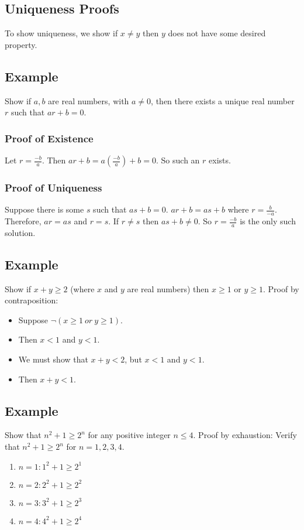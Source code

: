 \documentclass[letterpaper, 12pt]{math}
\begin{document}
\subsection*{Uniqueness Proofs}
To show uniqueness, we show if \( x \neq y \) then \( y \) does not have some
desired property.

\subsection*{Example}
Show if \( a,b \) are real numbers, with \( a \neq 0 \), then there exists a
unique real number \( r \) such that \( ar+b = 0 \).

\subsubsection*{Proof of Existence}
Let \( r = \frac{-b}{a} \). Then \( ar+b = a(\frac{-b}{a})+b = 0 \). So such an
\( r \) exists.

\subsubsection*{Proof of Uniqueness}
Suppose there is some \( s \) such that \( as+b = 0 \). \( ar+b = as+b \) where
\( r = \frac{b}{-a} \). Therefore, \( ar = as \) and \( r = s \). If
\( r \neq s \) then \( as+b \neq 0 \). So \( r = \frac{-b}{a} \) is the only
such solution.

\subsection*{Example}
Show if \( x + y \geq 2 \) (where \( x \) and \( y \) are real numbers) then
\( x \geq 1 \) or \( y \geq 1 \). Proof by contraposition:
\begin{itemize}
  \item Suppose \( \neg{(x \geq 1\ or\ y \geq 1)} \).
  \item Then \( x < 1 \) and \( y < 1 \).
  \item We must show that \( x+y < 2 \), but \( x < 1 \) and \( y < 1 \).
  \item Then \( x+y < 1 \).
\end{itemize}

\subsection*{Example}
Show that \( n^{2}+1 \geq 2^{n} \) for any positive integer \( n \leq 4 \).
Proof by exhaustion: Verify that \( n^{2}+1 \geq 2^{n} \) for \( n = 1,2,3,4 \).
\begin{enumerate}
  \item \( n = 1: 1^{2}+1 \geq 2^{1} \)
  \item \( n = 2: 2^{2}+1 \geq 2^{2} \)
  \item \( n = 3: 3^{2}+1 \geq 2^{3} \)
  \item \( n = 4: 4^{2}+1 \geq 2^{4} \)
\end{enumerate}
\end{document}

